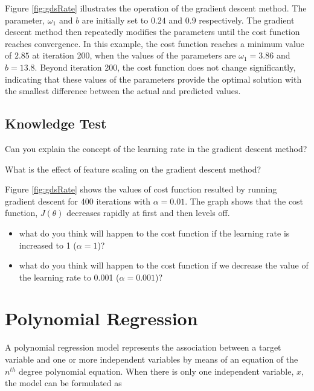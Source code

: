 {Figure \ref{fig:gdsRate} illustrates the operation of the gradient descent method. The parameter, $\omega_1$ and $b$ are initially set to $0.24$ and $0.9$ respectively. The gradient descent method then repeatedly modifies the parameters until the cost function reaches convergence. In this example, the cost function reaches a minimum value of $2.85$ at iteration 200, when the values of the parameters are $\omega_1 = 3.86$ and $b = 13.8$. Beyond iteration 200, the cost function does not change significantly, indicating that these values of the parameters provide the optimal solution with the smallest difference between the actual and predicted values.

\subsection{Knowledge Test}

\begin{questions}

\question Can you explain the concept of the learning rate in the gradient descent method?

\question What is the effect of feature scaling on the gradient descent method?

\question Figure \ref{fig:gdsRate} shows the values of cost function resulted by running gradient descent for 400 iterations with $\alpha =0.01$. The graph shows that the cost function, $J(\theta)$ decreases rapidly at first and then levels off.
\begin{itemize}
  \item what do you think will happen to the cost function if the learning rate is increased to 1 ($\alpha =1$)?
  \item what do you think will happen to the cost function if we decrease the value of the learning rate to 0.001 ($\alpha =0.001$)?
\end{itemize}

\end{questions}

\newpage

\section{Polynomial Regression}
A polynomial regression model represents the association between a target variable and one or more independent variables by means of an equation of the $n^{th}$ degree polynomial equation. When there is only one independent variable, $x$, the model can be formulated as

}
